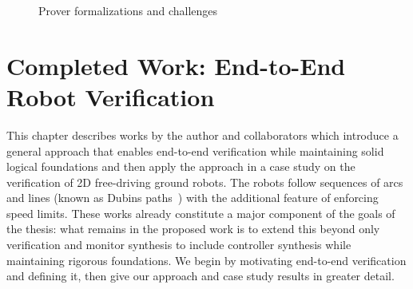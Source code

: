 \documentclass[12pt]{cmuthesis}
\theoremstyle{definition}
\theoremstyle{remark}
\begin{document}
  \begin{figure}
    \centering
\caption{Prover formalizations and challenges}
\label{fig:prover-formalizations}
  \end{figure}

\chapter{Completed Work:  End-to-End Robot Verification}
\label{ch:end-to-end-v}
This chapter describes  works by the author and collaborators which introduce a general approach that enables end-to-end verification while maintaining solid logical foundations and then apply the approach in a case study on the verification of 2D free-driving ground robots.
The robots follow sequences of arcs and lines (known as Dubins paths~\cite{citeulike:12223454}) with the additional feature of enforcing speed limits.
These works already constitute a major component of the goals of the thesis: what remains in the proposed work is to extend this beyond only verification and monitor synthesis to include controller synthesis while maintaining rigorous foundations.
We begin by motivating end-to-end verification and defining it, then give our approach and case study results in greater detail.
\end{document}
